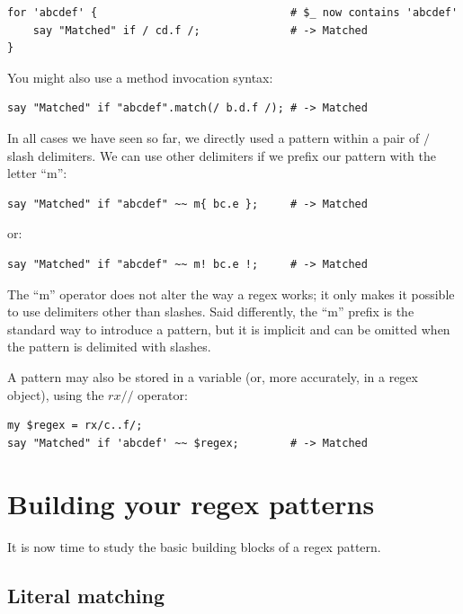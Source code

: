 \begin{verbatim}
for 'abcdef' {                              # $_ now contains 'abcdef'
    say "Matched" if / cd.f /;              # -> Matched
}
\end{verbatim}
%

You might also use a method invocation syntax:
\begin{verbatim}
say "Matched" if "abcdef".match(/ b.d.f /); # -> Matched
\end{verbatim}
%

In all cases we have seen so far, we directly used a pattern 
within a pair of $/$ slash delimiters. We can use other 
delimiters if we prefix our pattern with the letter ``m'':

\begin{verbatim}
say "Matched" if "abcdef" ~~ m{ bc.e };     # -> Matched
\end{verbatim}
%

or:
\begin{verbatim}
say "Matched" if "abcdef" ~~ m! bc.e !;     # -> Matched
\end{verbatim}
%

The ``m'' operator does not alter the way a regex works; it 
only makes it possible to use delimiters other than slashes. 
Said differently, the ``m'' prefix is the standard way to 
introduce a pattern, but it is implicit and can be omitted 
when the pattern is delimited with slashes.

A pattern may also be stored in a variable (or, more 
accurately, in a regex object), using the $rx//$ operator:

\begin{verbatim}
my $regex = rx/c..f/;
say "Matched" if 'abcdef' ~~ $regex;        # -> Matched
\end{verbatim}
%


\section{Building your regex patterns}
\label{pattern}

It is now time to study the basic building blocks of a 
regex pattern.

\subsection{Literal matching}

